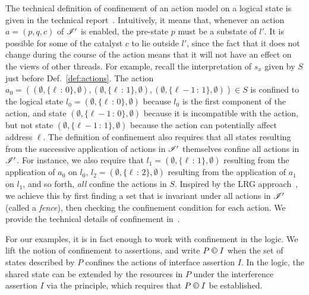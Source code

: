The technical definition of confinement of an action model on a
logical state is given in the technical report~\cite{colosl-tr14}. Intuitively,
it means that, whenever an action $a = (p, q, c)$ of
$\mathscr{I}'$ is enabled, the pre-state $p$ must be a substate of $l'$.  It is
possible for some of the catalyst $c$ to lie outside $l'$, since the
fact that it does not change during the course of the action means
that it will not have an effect on the views of other threads.
For example, recall the interpretation of $s_x$ given by $S$ just
before Def.~\ref{def:actions}. The action $a_0 = ((\emptyset, \{\ell\,{:}\,0\},
\emptyset), (\emptyset, \{\ell\,{:}\,1\}, \emptyset), (\emptyset,
\{\ell{-}1\,{:}\,1\}, \emptyset))\in S$ is confined to the logical state
$l_0=(\emptyset, \{\ell\,{:}\,0\}, \emptyset)$ because $l_0$ is the first component of the
action, and state $(\emptyset, \{\ell{-}1\,{:}\,0\}, \emptyset)$
because it  is incompatible with the
action, but not state $(\emptyset, \{\ell{-}1\,{:}\,1\}, \emptyset)$ because the action can
potentially affect address $\ell$.
%
The definition of confinement also requires that all states resulting
from the successive application of actions in $\mathscr{I}'$ themselves
confine all actions in $\mathscr{I}'$. For instance, we also require that
$l_1 = (\emptyset, \{\ell\,{:}\,1\}, \emptyset)$  resulting from the application of $a_0$ on $l_0$, $l_2 = (\emptyset, \{\ell\,{:}\,2\}, \emptyset)$ resulting from the application of $a_1$ on $l_1$, and so forth, \emph{all} confine the actions in $S$. 
Inspired by the LRG approach~\cite{lrg}, we achieve this by
first finding a set that is invariant under all actions in $\mathscr{I}'$
(called a \emph{fence}), then checking the confinement condition for
each action. We provide the technical details of confinement in~\cite{colosl-tr14}.

For our  examples, it is in fact enough to work with confinement in the
logic. We lift the notion of confinement to assertions,  and write
$P \confines I$ when the set of states described by $P$
 confines the actions of interface assertion $I$.  In the logic, the
 shared state can be extended by the resources in
$P$ under the interference assertion $I$ via the \extendRule principle,
which requires that $P\containI I$ be
established. 


